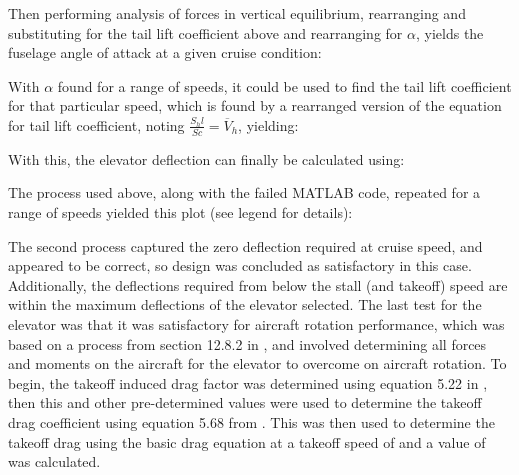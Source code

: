 \documentclass[../../main.tex]{subfiles}
\begin{document}

Then performing analysis of forces in vertical equilibrium, rearranging and substituting for the tail lift coefficient above and rearranging for $\alpha$, yields the fuselage angle of attack at a given cruise condition: 


With $\alpha$ found for a range of speeds, it could be used to find the tail lift coefficient for that particular speed, which is found by a rearranged version of the equation for tail lift coefficient, noting $\frac{S_h l}{Sc} = \overline{V}_h$, yielding: 


With this, the elevator deflection can finally be calculated using:


The process used above, along with the failed MATLAB code, repeated for a range of speeds yielded this plot (see legend for details):


The second process captured the zero deflection required at cruise speed, and appeared to be correct, so design was concluded as satisfactory in this case.
Additionally, the deflections required from below the stall (and takeoff) speed are within the maximum deflections of the elevator selected.
The last test for the elevator was that it was satisfactory for aircraft rotation performance, which was based on a process from section 12.8.2 in \cite{sadraey-13}, and involved determining all forces and moments on the aircraft for the elevator to overcome on aircraft rotation.
To begin, the takeoff induced drag factor was determined using equation 5.22 in \cite{sadraey-13}, then this and other pre-determined values were used to determine the takeoff drag coefficient using equation 5.68 from \cite{sadraey-13}.
This was then used to determine the takeoff drag using the basic drag equation at a takeoff speed of  and a value of  was calculated.  
\end{document}
